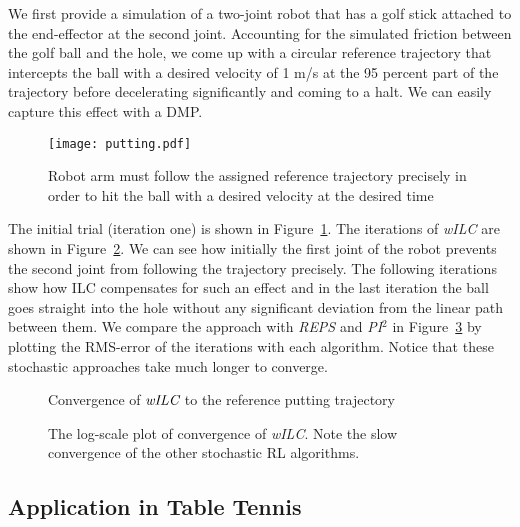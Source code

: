 We first provide a simulation of a two-joint robot that has a golf stick attached to the end-effector at the second joint. Accounting for the simulated friction between the golf ball and the hole, we come up with a circular reference trajectory that intercepts the ball with a desired velocity of 1 m/s at the 95 percent part of the trajectory before decelerating significantly and coming to a halt. We can easily capture this effect with a DMP.

\begin{figure}
\center
\texttt{[image: putting.pdf]}		
\caption{Robot arm must follow the assigned reference trajectory precisely in order to hit the ball with a desired velocity at the desired time}
\label{putting1}
\end{figure}

The initial trial (iteration one) is shown in Figure~\ref{putting1}. The iterations of \emph{wILC} are shown in Figure~\ref{wILCTrajectoryPutting}. We can see how initially the first joint of the robot prevents the second joint from following the trajectory precisely. The following iterations show how ILC compensates for such an effect and in the last iteration the ball goes straight into the hole without any significant deviation from the linear path between them. We compare the approach with \emph{REPS} and \emph{PI$^{2}$} in Figure~\ref{puttingComparison} by plotting the RMS-error of the iterations with each algorithm. Notice that these stochastic approaches take much longer to converge.

\begin{figure}
\center
\scalebox{1.0}{}
\caption{Convergence of $\emph{wILC}$ to the reference putting trajectory}
\label{wILCTrajectoryPutting}
\end{figure}

\begin{figure}
\begingroup
\scalebox{0.5}{}
\endgroup
\caption{The log-scale plot of convergence of \emph{wILC}. Note the slow convergence of the other stochastic RL algorithms.}
\label{puttingComparison}
\end{figure}

\subsection{Application in Table Tennis}


